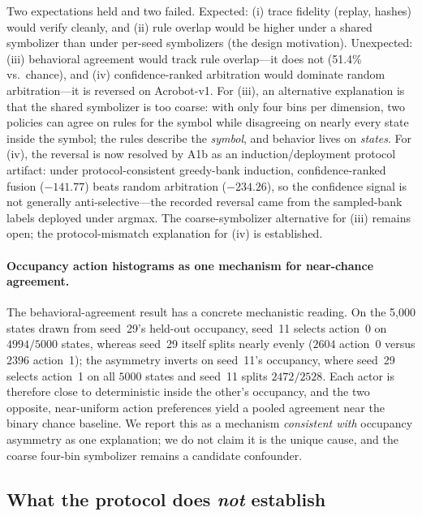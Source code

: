 \documentclass[11pt]{article}
\begin{document}
Two expectations held and two failed. Expected: (i) trace fidelity (replay, hashes) would verify
cleanly, and (ii) rule overlap would be higher under a shared symbolizer than under per-seed
symbolizers (the design motivation). Unexpected: (iii) behavioral agreement would track rule
overlap---it does not (51.4\% vs.\ chance), and (iv) confidence-ranked arbitration would dominate
random arbitration---it is reversed on Acrobot-v1. For (iii), an alternative explanation is that
the shared symbolizer is too coarse: with only four bins per dimension, two policies can agree on
rules for the symbol while disagreeing on nearly every state inside the symbol; the rules describe
the \emph{symbol}, and behavior lives on \emph{states}. For (iv), the reversal is now resolved by A1b as an induction/deployment protocol artifact: under
protocol-consistent greedy-bank induction, confidence-ranked fusion ($-141.77$) beats random arbitration
($-234.26$), so the confidence signal is not generally anti-selective---the recorded reversal came from
the sampled-bank labels deployed under argmax. The coarse-symbolizer alternative for (iii) remains open;
the protocol-mismatch explanation for (iv) is established.

\paragraph{Occupancy action histograms as one mechanism for near-chance agreement.}
The behavioral-agreement result has a concrete mechanistic reading. On the 5{,}000 states drawn from
seed~29's held-out occupancy, seed~11 selects action~0 on $4994/5000$ states, whereas seed~29 itself
splits nearly evenly ($2604$ action~0 versus $2396$ action~1); the asymmetry inverts on seed~11's
occupancy, where seed~29 selects action~1 on all $5000$ states and seed~11 splits $2472/2528$. Each
actor is therefore close to deterministic inside the other's occupancy, and the two opposite,
near-uniform action preferences yield a pooled agreement near the binary chance baseline. We report
this as a mechanism \emph{consistent with} occupancy asymmetry as one explanation; we do not claim it
is the unique cause, and the coarse four-bin symbolizer remains a candidate confounder.

\subsection{What the protocol does \emph{not} establish}
\label{sec:discussion:not}
\end{document}
